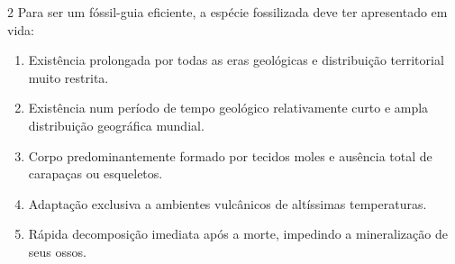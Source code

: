 \documentclass[twoside, 10pt, a4paper]{article}
\newlength{\espacoQuestao}
\newlength{\espacoAlt}
\begin{document}
\begin{multicols*}{2}
Para ser um fóssil-guia eficiente, a espécie fossilizada deve ter apresentado em vida:

\begin{enumerate}[label=\alph*), itemsep=\espacoAlt]
\item Existência prolongada por todas as eras geológicas e distribuição territorial muito restrita.
\item Existência num período de tempo geológico relativamente curto e ampla distribuição geográfica mundial.
\item Corpo predominantemente formado por tecidos moles e ausência total de carapaças ou esqueletos.
\item Adaptação exclusiva a ambientes vulcânicos de altíssimas temperaturas.
\item Rápida decomposição imediata após a morte, impedindo a mineralização de seus ossos.
\end{enumerate}
\par\vspace{\espacoQuestao}

\end{multicols*}
\end{document}
